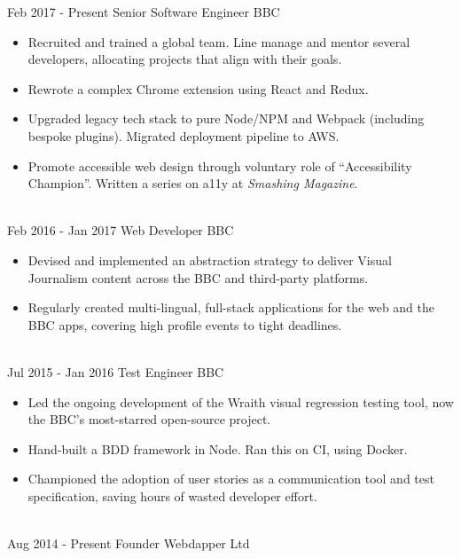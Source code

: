 \documentclass[letterpaper]{twentysecondcv} %
\begin{document}
\begin{twenty} %
    \twentyitem
    	{Feb 2017 -}
		{Present}
        {Senior Software Engineer}
        {BBC}
        {}
        {
        \begin{itemize}
        \item Recruited and trained a global team. Line manage and mentor several developers, allocating projects that align with their goals.
        \item Rewrote a complex Chrome extension using React and Redux.
        \item Upgraded legacy tech stack to pure Node/NPM and Webpack (including bespoke plugins). Migrated deployment pipeline to AWS.
        \item Promote accessible web design through voluntary role of ``Accessibility Champion''. Written a series on a11y at \emph{Smashing Magazine}.
        \end{itemize}
    	}
    \\
	\twentyitem
    	{Feb 2016 -}
		{Jan 2017}
        {Web Developer}
        {BBC}
        {}
        {
        {\begin{itemize}
        \item Devised and implemented an abstraction strategy to deliver Visual Journalism content across the BBC and third-party platforms.
        \item Regularly created multi-lingual, full-stack applications for the web and the BBC apps, covering high profile events to tight deadlines.
    \end{itemize}}
        }
    \\
    \twentyitem
  		{Jul 2015 -}
		{Jan 2016}
        {Test Engineer}
        {BBC}
        {}
        {
        {\begin{itemize}
        \item Led the ongoing development of the Wraith visual regression testing tool, now the BBC's most-starred open-source project.
        \item Hand-built a BDD framework in Node. Ran this on CI, using Docker.
        \item Championed the adoption of user stories as a communication tool and test specification, saving hours of wasted developer effort.
    \end{itemize}}
        }
     \\
     \twentyitem
   		{Aug 2014 -}
		{Present}
        {Founder}
        {Webdapper Ltd}
        {}
        {
        \begin{itemize}

\end{itemize}}
\end{twenty}
\end{document}
